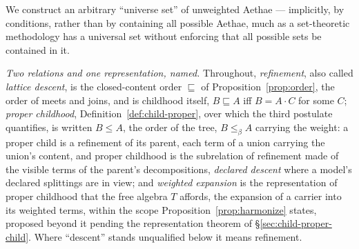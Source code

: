 \label{sec:intrinsic}

We construct an arbitrary ``universe set'' of unweighted Aethae --- implicitly, by conditions, rather than by containing all possible Aethae, much as a set-theoretic methodology has a universal set without enforcing that all possible sets be contained in it.

\noindent\textit{Two relations and one representation, named.} Throughout, \emph{refinement}, also called \emph{lattice descent}, is the closed-content order $\sqsubseteq$ of Proposition~\ref{prop:order}, the order of meets and joins, and is childhood itself, $B \sqsubseteq A$ iff $B = A \cdot C$ for some $C$; \emph{proper childhood}, Definition~\ref{def:child-proper}, over which the third postulate quantifies, is written $B \le A$, the order of the tree, $B \le_\beta A$ carrying the weight: a proper child is a refinement of its parent, each term of a union carrying the union's content, and proper childhood is the subrelation of refinement made of the visible terms of the parent's decompositions, \emph{declared descent} where a model's declared splittings are in view; and \emph{weighted expansion} is the representation of proper childhood that the free algebra $T$ affords, the expansion of a carrier into its weighted terms, within the scope Proposition~\ref{prop:harmonize} states, proposed beyond it pending the representation theorem of \S\ref{sec:child-proper-child}. Where ``descent'' stands unqualified below it means refinement.

